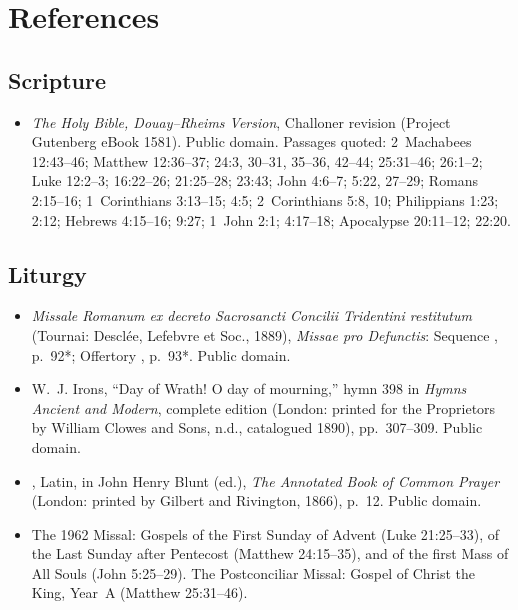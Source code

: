 \section{References}

\begingroup
\setlength{\parskip}{0pt}
\titlespacing*{\subsection}{0pt}{1.0ex}{0.3ex}

\subsection*{Scripture}

{\fontsize{8.6}{9.6}\selectfont
\begin{itemize}[itemsep=0pt,parsep=0pt,topsep=0.05em]
\item \emph{The Holy Bible, Douay--Rheims Version}, Challoner revision (Project Gutenberg eBook 1581). Public domain. Passages quoted: 2~Machabees 12:43--46; Matthew 12:36--37; 24:3, 30--31, 35--36, 42--44; 25:31--46; 26:1--2; Luke 12:2--3; 16:22--26; 21:25--28; 23:43; John 4:6--7; 5:22, 27--29; Romans 2:15--16; 1~Corinthians 3:13--15; 4:5; 2~Corinthians 5:8, 10; Philippians 1:23; 2:12; Hebrews 4:15--16; 9:27; 1~John 2:1; 4:17--18; Apocalypse 20:11--12; 22:20.
\end{itemize}}

\subsection*{Liturgy}

{\fontsize{8.6}{9.6}\selectfont
\begin{itemize}[itemsep=0pt,parsep=0pt,topsep=0.05em]
\item \emph{Missale Romanum ex decreto Sacrosancti Concilii Tridentini restitutum} (Tournai: Desclée, Lefebvre et Soc., 1889), \emph{Missae pro Defunctis}: Sequence , p.~92*; Offertory , p.~93*. Public domain.
\item W.~J. Irons, ``Day of Wrath! O day of mourning,'' hymn 398 in \emph{Hymns Ancient and Modern}, complete edition (London: printed for the Proprietors by William Clowes and Sons, n.d., catalogued 1890), pp.~307--309. Public domain.
\item {}, Latin, in John Henry Blunt (ed.), \emph{The Annotated Book of Common Prayer} (London: printed by Gilbert and Rivington, 1866), p.~12. Public domain.
\item The 1962 Missal: Gospels of the First Sunday of Advent (Luke 21:25--33), of the Last Sunday after Pentecost (Matthew 24:15--35), and of the first Mass of All Souls (John 5:25--29). The Postconciliar Missal: Gospel of Christ the King, Year~A (Matthew 25:31--46).
\end{itemize}}


